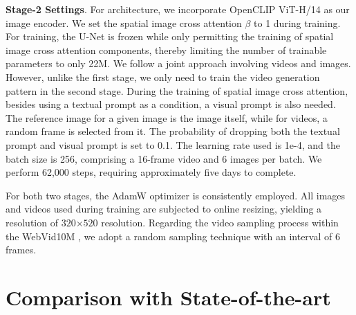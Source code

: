 \noindent\textbf{Stage-2 Settings}.
For architecture, we incorporate OpenCLIP ViT-H/14 \cite{ilharco2021openclip} as our image encoder. We set the spatial image cross attention $\beta$ to 1 during training.
For training, the U-Net is frozen while only permitting the training of spatial image cross attention components, thereby limiting the number of trainable parameters to only 22M. 
We follow a joint approach involving videos and images. 
However, unlike the first stage, we only need to train the video generation pattern in the second stage. 
During the training of spatial image cross attention, besides using a textual prompt as a condition, a visual prompt is also needed. 
The reference image for a given image is the image itself, while for videos, a random frame is selected from it. 
The probability of dropping both the textual prompt and visual prompt is set to 0.1. 
The learning rate used is 1e-4, and the batch size is 256, comprising a 16-frame video and 6 images per batch. 
We perform 62,000 steps, requiring approximately five days to complete. 

For both two stages, the AdamW \cite{Loshchilov2017DecoupledWD} optimizer is consistently employed. 
All images and videos used during training are subjected to online resizing, yielding a resolution of $320$$\times$$520$ resolution.
Regarding the video sampling process within the WebVid10M \cite{bain2021frozen}, we adopt a random sampling technique with an interval of 6 frames.





\section{Comparison with State-of-the-art}

